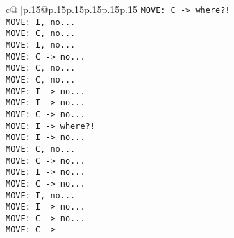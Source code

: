 \documentclass{article}
\begin{document}
{\begin{supertabular}{c@{$\;$}|p{.15\linewidth}@{}p{.15\linewidth}p{.15\linewidth}p{.15\linewidth}p{.15\linewidth}p{.15\linewidth}}
{{{\tt  MOVE: C -> where?!\\ \tt  MOVE: I, no...\\ \tt  MOVE: C, no...\\ \tt  MOVE: I, no...\\ \tt  MOVE: C -> no...\\ \tt  MOVE: C, no...\\ \tt  MOVE: C, no...\\ \tt  MOVE: I -> no...\\ \tt  MOVE: I -> no...\\ \tt  MOVE: C -> no...\\ \tt  MOVE: I -> where?!\\ \tt  MOVE: I -> no...\\ \tt  MOVE: C, no...\\ \tt  MOVE: C -> no...\\ \tt  MOVE: I -> no...\\ \tt  MOVE: C -> no...\\ \tt  MOVE: I, no...\\ \tt  MOVE: I -> no...\\ \tt  MOVE: C -> no...\\ \tt  MOVE: C ->}}}
\end{supertabular}}
\end{document}
